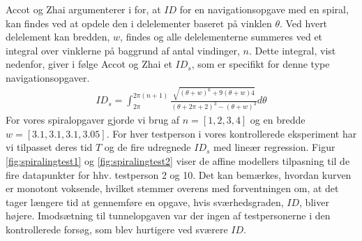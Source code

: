 Accot og Zhai argumenterer i \cite{accot1997} for, at $ID$ for en navigationsopgave med en spiral, kan findes ved at opdele den i delelementer baseret på vinklen $\theta$. Ved hvert delelement kan bredden, $w$, findes og alle delelementerne summeres ved et integral over vinklerne på baggrund af antal vindinger, $n$. Dette integral, vist nedenfor, giver i følge Accot og Zhai et $ID_s$, som er specifikt for denne type navigationsopgaver. 
\begin{align*}
ID_s = \int_{2\pi}^{2\pi(n+1)}\frac{\sqrt{\left(\theta+w\right)^6+9\left(\theta+w\right)4}}{\left(\theta+2\pi+2\right)^3-\left(\theta+w\right)^3}d\theta
\end{align*}
For vores spiralopgaver gjorde vi brug af $n=[1,2,3,4]$ og en bredde $w=[3.1,3.1,3.1,3.05]$. For hver testperson i vores kontrollerede eksperiment har vi tilpasset deres tid $T$ og de fire udregnede $ID_s$ med lineær regression. Figur \ref{fig:spiralingtest1} og \ref{fig:spiralingtest2} viser de affine modellers tilpasning til de fire datapunkter for hhv. testperson 2 og 10. Det kan bemærkes, hvordan kurven er monotont voksende, hvilket stemmer overens med forventningen om, at det tager længere tid at gennemføre en opgave, hvis sværhedsgraden, $ID$, bliver højere. Imodsætning til tunnelopgaven var der ingen af testpersonerne i den kontrollerede forsøg, som blev hurtigere ved sværere $ID$.

